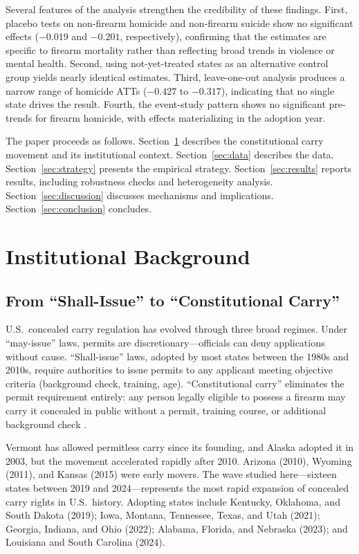\documentclass[12pt]{article}
\begin{document}
Several features of the analysis strengthen the credibility of these findings. First, placebo tests on non-firearm homicide and non-firearm suicide show no significant effects ($-0.019$ and $-0.201$, respectively), confirming that the estimates are specific to firearm mortality rather than reflecting broad trends in violence or mental health. Second, using not-yet-treated states as an alternative control group yields nearly identical estimates. Third, leave-one-out analysis produces a narrow range of homicide ATTs ($-0.427$ to $-0.317$), indicating that no single state drives the result. Fourth, the event-study pattern shows no significant pre-trends for firearm homicide, with effects materializing in the adoption year.

The paper proceeds as follows. Section~\ref{sec:background} describes the constitutional carry movement and its institutional context. Section~\ref{sec:data} describes the data. Section~\ref{sec:strategy} presents the empirical strategy. Section~\ref{sec:results} reports results, including robustness checks and heterogeneity analysis. Section~\ref{sec:discussion} discusses mechanisms and implications. Section~\ref{sec:conclusion} concludes.

\section{Institutional Background}
\label{sec:background}

\subsection{From ``Shall-Issue'' to ``Constitutional Carry''}

U.S.\ concealed carry regulation has evolved through three broad regimes. Under ``may-issue'' laws, permits are discretionary---officials can deny applications without cause. ``Shall-issue'' laws, adopted by most states between the 1980s and 2010s, require authorities to issue permits to any applicant meeting objective criteria (background check, training, age). ``Constitutional carry'' eliminates the permit requirement entirely: any person legally eligible to possess a firearm may carry it concealed in public without a permit, training course, or additional background check \citep{smart2023}.

Vermont has allowed permitless carry since its founding, and Alaska adopted it in 2003, but the movement accelerated rapidly after 2010. Arizona (2010), Wyoming (2011), and Kansas (2015) were early movers. The wave studied here---sixteen states between 2019 and 2024---represents the most rapid expansion of concealed carry rights in U.S.\ history. Adopting states include Kentucky, Oklahoma, and South Dakota (2019); Iowa, Montana, Tennessee, Texas, and Utah (2021); Georgia, Indiana, and Ohio (2022); Alabama, Florida, and Nebraska (2023); and Louisiana and South Carolina (2024).
\end{document}
